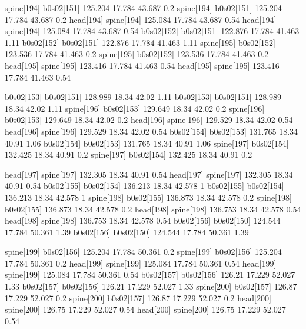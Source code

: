 spine[194]    b0s02[151]    125.204    17.784    43.687    0.2
spine[194]    b0s02[151]    125.204    17.784    43.687    0.2
head[194]    spine[194]    125.084    17.784    43.687    0.54
head[194]    spine[194]    125.084    17.784    43.687    0.54
b0s02[152]    b0s02[151]    122.876    17.784    41.463    1.11
b0s02[152]    b0s02[151]    122.876    17.784    41.463    1.11
spine[195]    b0s02[152]    123.536    17.784    41.463    0.2
spine[195]    b0s02[152]    123.536    17.784    41.463    0.2
head[195]    spine[195]    123.416    17.784    41.463    0.54
head[195]    spine[195]    123.416    17.784    41.463    0.54


b0s02[153]    b0s02[151]    128.989    18.34    42.02    1.11
b0s02[153]    b0s02[151]    128.989    18.34    42.02    1.11
spine[196]    b0s02[153]    129.649    18.34    42.02    0.2
spine[196]    b0s02[153]    129.649    18.34    42.02    0.2
head[196]    spine[196]    129.529    18.34    42.02    0.54
head[196]    spine[196]    129.529    18.34    42.02    0.54
b0s02[154]    b0s02[153]    131.765    18.34    40.91    1.06
b0s02[154]    b0s02[153]    131.765    18.34    40.91    1.06
spine[197]    b0s02[154]    132.425    18.34    40.91    0.2
spine[197]    b0s02[154]    132.425    18.34    40.91    0.2


head[197]    spine[197]    132.305    18.34    40.91    0.54
head[197]    spine[197]    132.305    18.34    40.91    0.54
b0s02[155]    b0s02[154]    136.213    18.34    42.578    1
b0s02[155]    b0s02[154]    136.213    18.34    42.578    1
spine[198]    b0s02[155]    136.873    18.34    42.578    0.2
spine[198]    b0s02[155]    136.873    18.34    42.578    0.2
head[198]    spine[198]    136.753    18.34    42.578    0.54
head[198]    spine[198]    136.753    18.34    42.578    0.54
b0s02[156]    b0s02[150]    124.544    17.784    50.361    1.39
b0s02[156]    b0s02[150]    124.544    17.784    50.361    1.39


spine[199]    b0s02[156]    125.204    17.784    50.361    0.2
spine[199]    b0s02[156]    125.204    17.784    50.361    0.2
head[199]    spine[199]    125.084    17.784    50.361    0.54
head[199]    spine[199]    125.084    17.784    50.361    0.54
b0s02[157]    b0s02[156]    126.21    17.229    52.027    1.33
b0s02[157]    b0s02[156]    126.21    17.229    52.027    1.33
spine[200]    b0s02[157]    126.87    17.229    52.027    0.2
spine[200]    b0s02[157]    126.87    17.229    52.027    0.2
head[200]    spine[200]    126.75    17.229    52.027    0.54
head[200]    spine[200]    126.75    17.229    52.027    0.54


